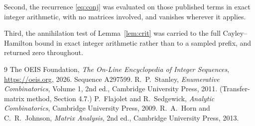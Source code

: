 \documentclass[11pt,a4paper]{article}
\theoremstyle{plain}
\theoremstyle{definition}
\begin{document}
Second, the recurrence \eqref{eq:conj} was evaluated on those published terms in exact
integer arithmetic, with no matrices involved, and vanishes wherever it applies.

Third, the annihilation test of Lemma~\ref{lem:crit} was carried to the full
Cayley--Hamilton bound in exact integer arithmetic rather than to a sampled prefix, and
returned zero throughout.

\begin{thebibliography}{9}
 The OEIS Foundation, \emph{The On-Line Encyclopedia of Integer
Sequences}, \url{https://oeis.org}, 2026. Sequence A297599.
 R.~P.~Stanley, \emph{Enumerative Combinatorics}, Volume 1, 2nd ed.,
Cambridge University Press, 2011. (Transfer-matrix method, Section 4.7.)
 P.~Flajolet and R.~Sedgewick, \emph{Analytic Combinatorics}, Cambridge
University Press, 2009.
 R.~A.~Horn and C.~R.~Johnson, \emph{Matrix Analysis}, 2nd ed., Cambridge
University Press, 2013.
\end{thebibliography}
\end{document}
